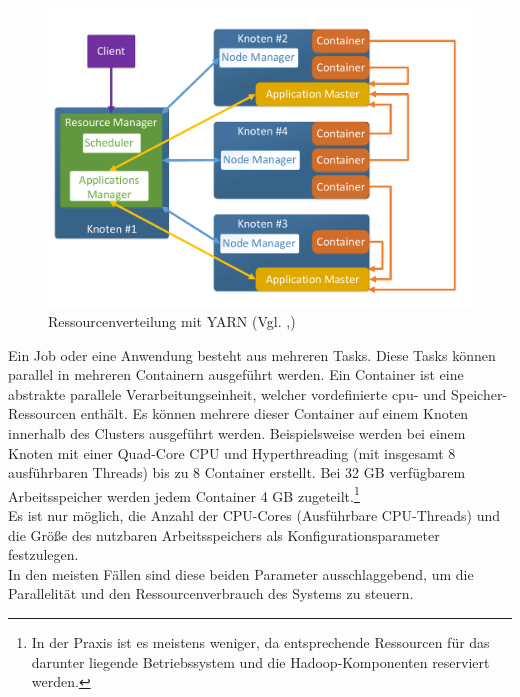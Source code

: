 \begin{figure}[ht]
  \centering
  \includegraphics[width=\textwidth]{./resource/yarn_cluster_architecture.pdf}
  \caption{Ressourcenverteilung mit YARN (Vgl. \cite{yarn_architecture},\cite{expert_hadoop_admin})}
  \label{fig:yarn_cluster_architecture}
\end{figure}

\noindent
Ein Job oder eine Anwendung besteht aus mehreren Tasks. Diese Tasks können parallel in mehreren Containern ausgeführt werden. Ein Container ist eine abstrakte parallele Verarbeitungseinheit, welcher vordefinierte \acrshort{cpu}- und Speicher-Ressourcen enthält. Es können mehrere dieser Container auf einem Knoten innerhalb des Clusters ausgeführt werden. Beispielsweise werden bei einem Knoten mit einer Quad-Core CPU und Hyperthreading (mit insgesamt 8 ausführbaren Threads) bis zu 8 Container erstellt. Bei 32 GB verfügbarem Arbeitsspeicher werden jedem Container 4 GB zugeteilt.\footnote{In der Praxis ist es meistens weniger, da entsprechende Ressourcen für das darunter liegende Betriebssystem und die Hadoop-Komponenten reserviert werden.}\\
Es ist nur möglich, die Anzahl der CPU-Cores (Ausführbare CPU-Threads) und die Größe des nutzbaren Arbeitsspeichers als Konfigurationsparameter festzulegen.\cite[S. 48-57]{expert_hadoop_admin}\\ In den meisten Fällen sind diese beiden Parameter ausschlaggebend, um die Parallelität und den Ressourcenverbrauch des Systems zu steuern.

